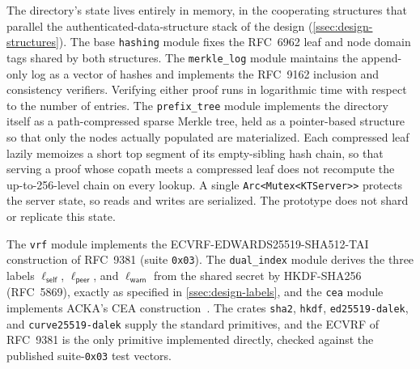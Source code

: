 The directory's state lives entirely in memory, in the cooperating structures that parallel the
authenticated-data-structure stack of the design (\cref{ssec:design-structures}). The base
\texttt{hashing} module fixes the RFC~6962 leaf and node domain tags shared by both structures.
The \texttt{merkle\_log} module maintains the append-only log as a vector of hashes and implements
the RFC~9162 inclusion and consistency verifiers. Verifying either proof runs in logarithmic time
with respect to the number of entries. The \texttt{prefix\_tree} module implements the directory itself as a
path-compressed sparse Merkle tree, held as a pointer-based structure so that only the nodes
actually populated are materialized. Each compressed leaf lazily memoizes a short top segment of its
empty-sibling hash chain, so that serving a proof whose copath meets a compressed leaf does not
recompute the up-to-256-level chain on every lookup. A single \texttt{Arc<Mutex<KTServer>{}>} protects the server state, so reads and writes are serialized.
The prototype does not shard or replicate this state.

The \texttt{vrf} module implements the
ECVRF-EDWARDS25519-SHA512-TAI construction of RFC~9381 (suite \texttt{0x03}). The \texttt{dual\_index} module
derives the three labels $\ell_{\mathsf{self}}$, $\ell_{\mathsf{peer}}$, and $\ell_{\mathsf{warn}}$
from the shared secret by HKDF-SHA256 (RFC~5869), exactly as specified in
\cref{ssec:design-labels}, and the \texttt{cea} module implements ACKA's CEA
construction~\cite[Section~5.1]{dowling2023acka}. The crates
\texttt{sha2}, \texttt{hkdf}, \texttt{ed25519-dalek}, and \texttt{curve25519-dalek} supply the standard
primitives, and the ECVRF of RFC~9381 is the only primitive implemented directly, checked against the published
suite-\texttt{0x03} test vectors.

